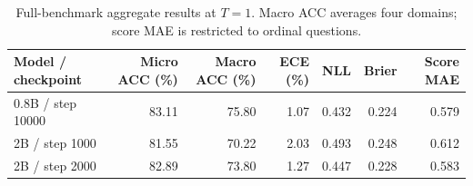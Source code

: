 \begin{table}[t]
\centering
\small
\setlength{\tabcolsep}{4pt}
\caption{Full-benchmark aggregate results at $T=1$. Macro ACC averages four domains; score MAE is restricted to ordinal questions.}
\label{tab:aggregate}
\begin{tabular}{lrrrrrr}
\toprule
Model / checkpoint & Micro ACC (\%) & Macro ACC (\%) & ECE (\%) & NLL & Brier & Score MAE \\
\midrule
0.8B / step 10000 & 83.11 & 75.80 & 1.07 & 0.432 & 0.224 & 0.579 \\
2B / step 1000 & 81.55 & 70.22 & 2.03 & 0.493 & 0.248 & 0.612 \\
2B / step 2000 & 82.89 & 73.80 & 1.27 & 0.447 & 0.228 & 0.583 \\
\bottomrule
\end{tabular}
\end{table}

